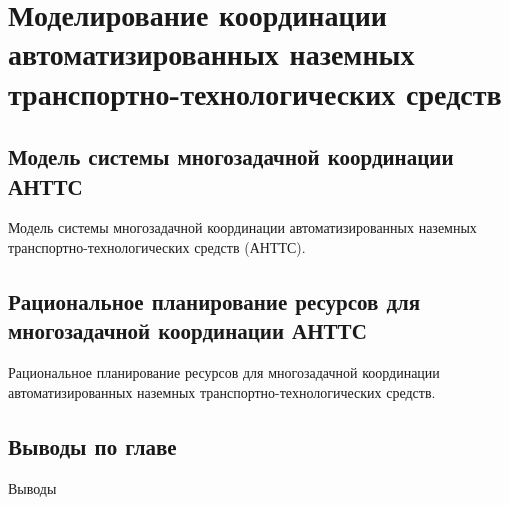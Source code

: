 \chapter{Моделирование координации автоматизированных наземных транспортно-технологических средств}\label{ch:ch2}

\section{Модель системы многозадачной координации АНТТС}\label{sec:ch2/sec1}

Модель системы многозадачной координации автоматизированных наземных транспортно-технологических средств (АНТТС).

\section{Рациональное планирование ресурсов для многозадачной координации АНТТС}\label{sec:ch2/sec2}

Рациональное планирование ресурсов для многозадачной координации автоматизированных наземных транспортно-технологических средств.

\section{Выводы по главе}\label{sec:ch2/sec3}

Выводы

\FloatBarrier
